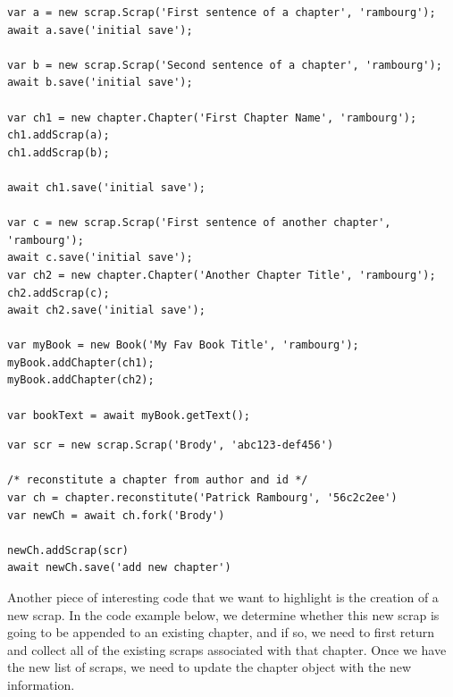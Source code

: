\documentclass[onecolumn, draftclsnofoot,10pt, compsoc]{IEEEtran}
\begin{document}
\begin{lstlisting}
var a = new scrap.Scrap('First sentence of a chapter', 'rambourg');
await a.save('initial save');

var b = new scrap.Scrap('Second sentence of a chapter', 'rambourg');
await b.save('initial save');

var ch1 = new chapter.Chapter('First Chapter Name', 'rambourg');
ch1.addScrap(a);
ch1.addScrap(b);

await ch1.save('initial save');

var c = new scrap.Scrap('First sentence of another chapter', 'rambourg');
await c.save('initial save');
var ch2 = new chapter.Chapter('Another Chapter Title', 'rambourg');
ch2.addScrap(c);
await ch2.save('initial save');

var myBook = new Book('My Fav Book Title', 'rambourg');
myBook.addChapter(ch1);
myBook.addChapter(ch2);

var bookText = await myBook.getText();
\end{lstlisting}

\begin{lstlisting}
var scr = new scrap.Scrap('Brody', 'abc123-def456')

/* reconstitute a chapter from author and id */
var ch = chapter.reconstitute('Patrick Rambourg', '56c2c2ee')
var newCh = await ch.fork('Brody')

newCh.addScrap(scr)
await newCh.save('add new chapter')
\end{lstlisting} 

\noindent Another piece of interesting code that we want to highlight is the creation of a new scrap. In the code example below, we determine whether this new scrap is going to be appended to an existing chapter, and if so, we need to first return and collect all of the existing scraps associated with that chapter. Once we have the new list of scraps, we need to update the chapter object with the new information.
\end{document}
